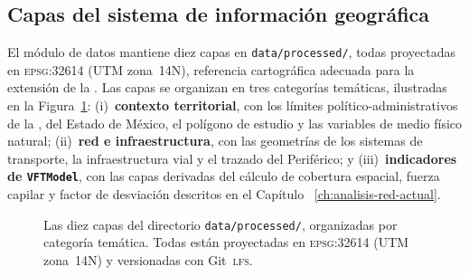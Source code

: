
\subsection{Capas del sistema de información geográfica}
\label{subsubsec:tg-capas}

El módulo de datos mantiene diez capas  en
\texttt{data/processed/}, todas proyectadas en \textsc{epsg}:32614 (UTM
zona~14N), referencia cartográfica adecuada para la extensión de la \zmvm{}. Las
capas se organizan en tres categorías temáticas, ilustradas en la
Figura~\ref{fig:tg-capas}: (i)~\textbf{contexto territorial}, con los límites
político-administrativos de la \cdmx{}, del Estado de México, el polígono de
estudio y las variables de medio físico natural;
(ii)~\textbf{red e infraestructura}, con las geometrías de los sistemas de
transporte, la infraestructura vial y el trazado del Periférico; y
(iii)~\textbf{indicadores de \texttt{VFTModel}}, con las capas derivadas del cálculo de
cobertura espacial, fuerza capilar y factor de desviación descritos en el
Capítulo~ \ref{ch:analisis-red-actual}.

\begin{figure}[htbp]
\centering

\caption[Organización de las capas GeoPackage de \texttt{Transport-gis-zmvm-mjg}]%
{Las diez capas  del directorio \texttt{data/processed/},
organizadas por
categoría temática. Todas están proyectadas en \textsc{epsg}:32614 (UTM
zona~14N) y versionadas con Git~\textsc{lfs}.}
\label{fig:tg-capas}
\end{figure}
